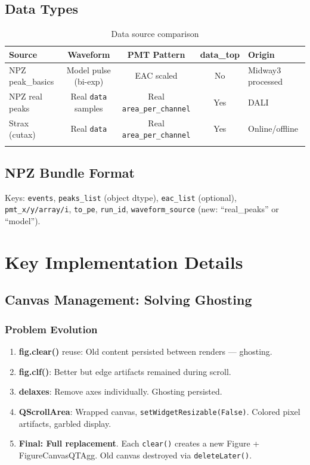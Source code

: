 \documentclass[12pt,a4paper]{article}
\begin{document}
\subsection{Data Types}

\begin{longtable}{|l|c|c|c|p{2.5cm}|}
\hline
\textbf{Source} & \textbf{Waveform} & \textbf{PMT Pattern} & \textbf{data\_top} & \textbf{Origin} \\
\hline
NPZ peak\_basics & Model pulse (bi-exp) & EAC scaled & No & Midway3 processed \\
NPZ real peaks & Real \texttt{data} samples & Real \texttt{area\_per\_channel} & Yes & DALI \\
Strax (cutax) & Real \texttt{data} & Real \texttt{area\_per\_channel} & Yes & Online/offline \\
\hline
\caption{Data source comparison}
\end{longtable}

\subsection{NPZ Bundle Format}
Keys: \texttt{events}, \texttt{peaks\_list} (object dtype), \texttt{eac\_list} (optional), \texttt{pmt\_x/y/array/i}, \texttt{to\_pe}, \texttt{run\_id}, \texttt{waveform\_source} (new: ``real\_peaks'' or ``model'').

\section{Key Implementation Details}

\subsection{Canvas Management: Solving Ghosting}

\subsubsection{Problem Evolution}
\begin{enumerate}[itemsep=2pt]
\item \textbf{fig.clear()} reuse: Old content persisted between renders --- ghosting.
\item \textbf{fig.clf()}: Better but edge artifacts remained during scroll.
\item \textbf{delaxes}: Remove axes individually. Ghosting persisted.
\item \textbf{QScrollArea}: Wrapped canvas, \texttt{setWidgetResizable(False)}. Colored pixel artifacts, garbled display.
\item \textbf{Final: Full replacement}. Each \texttt{clear()} creates a new Figure + FigureCanvasQTAgg. Old canvas destroyed via \texttt{deleteLater()}.
\end{enumerate}
\end{document}
